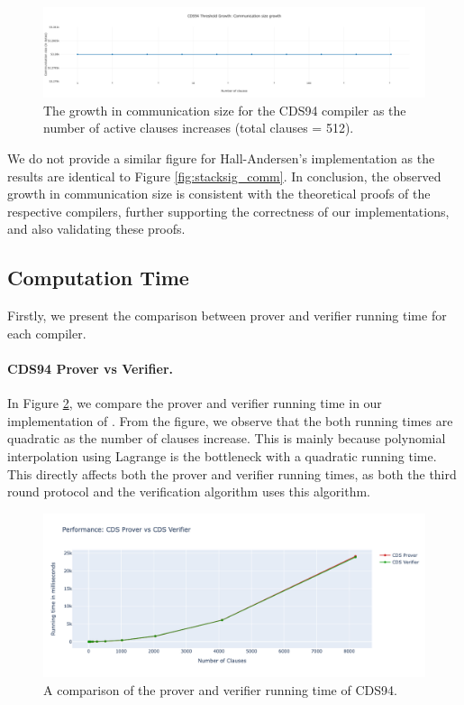 \begin{figure}[h]
  \centering
  \includegraphics[width=\linewidth]{../assets/plots/cds2_threshold.png}
  \caption{The growth in communication size for the CDS94 compiler as the number of active clauses increases (total clauses = 512).}
  \label{fig:cds_comm2}
\end{figure}

We do not provide a similar figure for Hall-Andersen's implementation as the 
results are identical to Figure \ref{fig:stacksig_comm}. In conclusion, the 
observed growth in communication size is consistent with the theoretical
proofs of the respective compilers, further supporting the correctness of our
implementations, and also validating these proofs.

\subsection{Computation Time}\label{eval:time}
Firstly, we present the comparison between prover and verifier running 
time for each compiler. 

\paragraph{CDS94 Prover vs Verifier.} In Figure \ref{fig:cds_vs}, we compare the 
prover and 
verifier running time in our implementation of \cite{CDS94}. From the figure, 
we observe that the both running times are quadratic as 
the number of clauses increase. This is mainly because polynomial interpolation
using Lagrange is the bottleneck with a quadratic running time. This 
directly affects both the prover and verifier running times, as both the 
third round protocol and the verification algorithm uses this algorithm. 

\begin{figure}[H]
  \centering
  \includegraphics[width=\linewidth]{../assets/plots/cds_vs.png}
  \caption{A comparison of the prover and verifier running time of CDS94. }
  \label{fig:cds_vs}
\end{figure}


